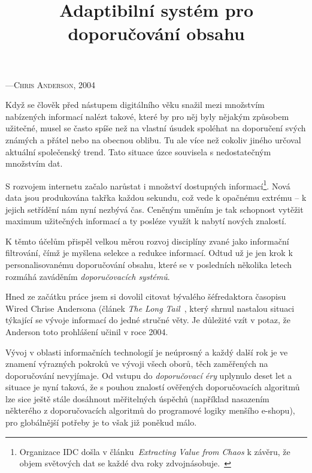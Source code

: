 \documentclass[thesis=M,czech]{FITthesis}[2014/05/07]
\title{Adaptibilní systém pro doporučování obsahu}
\begin{document}

\begin{introduction}
\begin{epigraphs}
%
 {---\textsc{Chris Anderson, 2004~\cite{anderson}}}
 \end{epigraphs}	
	Když se člověk před nástupem digitálního věku snažil mezi množstvím nabízených informací nalézt takové, které by pro něj byly nějakým způsobem užitečné, musel se často spíše než na vlastní úsudek spoléhat na doporučení svých známých a přátel nebo na obecnou oblibu. Tu ale více než cokoliv jiného určoval aktuální společenský trend. Tato situace úzce souvisela s nedostatečným množstvím dat.

	S rozvojem internetu začalo narůstat i množství dostupných informací\footnote{Organizace IDC došla v článku~\emph{Extracting Value from Chaos} k závěru, že objem světových dat se každé dva roky zdvojnásobuje.~\cite{digitaluniverse}}. Nová data jsou produkována takřka každou sekundu, což vede k opačnému extrému – k jejich setřídění nám nyní nezbývá čas. Ceněným uměním je tak schopnost vytěžit maximum užitečných informací a ty posléze využít k nabytí nových znalostí.
	
	K těmto účelům přispěl velkou měrou rozvoj disciplíny zvané jako informační filtrování, čímž je myšlena selekce a redukce informací. Odtud už je jen krok k personalisovanému doporučování obsahu, které se v posledních několika letech rozmáhá zaváděním \emph{doporučovacích systémů}. 

	Hned ze začátku práce jsem si dovolil citovat bývalého šéfredaktora časopisu Wired Chrise Andersona (článek \emph{The Long Tail~\cite{anderson}}, který shrnul nastalou situaci týkající se vývoje informací do jedné stručné věty. Je důležité vzít v potaz, že Anderson toto prohlášení učinil v roce 2004. 
	
	Vývoj v oblasti informačních technologií je neúprosný a každý další rok je ve znamení výrazných pokroků ve vývoji všech oborů, těch zaměřených na doporučování nevyjímaje. Od vstupu do \emph{doporučovací éry} uplynulo deset let a situace je nyní taková, že s pouhou znalostí ověřených doporučovacích algoritmů lze sice ještě stále dosáhnout měřitelných úspěchů (například nasazením některého z doporučovacích algoritmů do programové logiky menšího e-shopu), pro globálnější potřeby je to však již poněkud málo.
	

\end{introduction}
\end{document}
